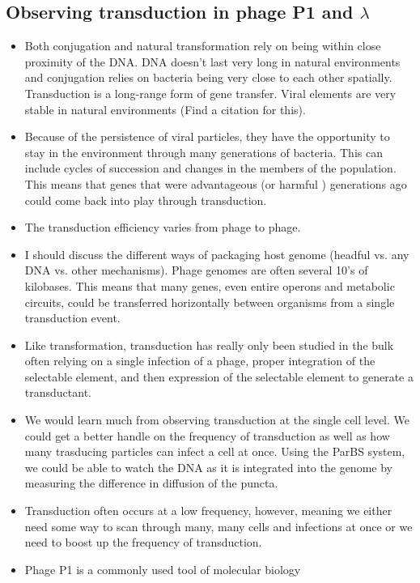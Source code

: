 \subsection*{Observing transduction in phage P1 and $\lambda$}
\begin{itemize}
	\item Both conjugation and natural transformation rely on being within close proximity of the DNA. DNA doesn't last very
		long in natural environments and conjugation relies on
		bacteria being very close to each other spatially.
		Transduction is a long-range form of gene transfer.
		Viral elements are very stable in natural environments
		(Find a citation for this).
	\item Because of the persistence of viral particles, they have
		the opportunity to stay in the environment through many
		generations of bacteria. This can include cycles of
		succession and changes in the members of the population. 
		This means that genes that were advantageous (or harmful
		) generations ago could come back into play through
		transduction.
	\item The transduction efficiency varies from phage to phage. 
	\item I should discuss the different ways of packaging host
		genome (headful vs. any DNA vs. other mechanisms).
		Phage genomes are often several 10's of kilobases.
		This means that many genes, even entire operons and
		metabolic circuits, could be transferred horizontally
		between organisms from a single transduction event. 
	\item Like transformation, transduction has really only been
		studied in the bulk often relying on a single infection
		of a phage, proper integration of the selectable
		element, and then expression of the selectable element
		to generate a transductant. 
	\item We would learn much from observing transduction at the
		single cell level. We could get a better handle on the
		frequency of transduction as well as how many trasducing
		particles can infect a cell at once. Using the ParBS
		system, we could be able to watch the DNA as it is
		integrated into the genome by measuring the difference
		in diffusion of the puncta.
	\item Transduction often occurs at a low frequency, however,
		meaning we either need some way to scan through many,
		many cells and infections at once or we need to boost up
		the frequency of transduction.
	\item Phage P1 is a commonly used tool of molecular biology

\end{itemize}
